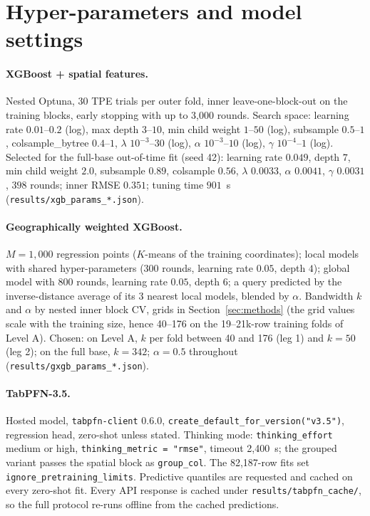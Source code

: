 \documentclass[11pt,a4paper]{article}
\begin{document}
\section{Hyper-parameters and model settings}
\label{app:hparams}

\paragraph{XGBoost + spatial features.} Nested Optuna, 30 TPE trials per outer fold, inner
leave-one-block-out on the training blocks, early stopping with up to 3{,}000 rounds. Search
space: learning rate $0.01$--$0.2$ (log), max depth $3$--$10$, min child weight $1$--$50$
(log), subsample $0.5$--$1$, colsample\_bytree $0.4$--$1$, $\lambda$ $10^{-3}$--$30$ (log),
$\alpha$ $10^{-3}$--$10$ (log), $\gamma$ $10^{-4}$--$1$ (log). Selected for the full-base
out-of-time fit (seed 42): learning rate $0.049$, depth $7$, min child weight $2.0$, subsample
$0.89$, colsample $0.56$, $\lambda$ $0.0033$, $\alpha$ $0.0041$, $\gamma$ $0.0031$, $398$
rounds; inner RMSE $0.351$; tuning time $901$~s
(\texttt{results/xgb\_params\_*.json}).

\paragraph{Geographically weighted XGBoost.} $M = 1{,}000$ regression points ($K$-means of the
training coordinates); local models with shared hyper-parameters ($300$ rounds, learning rate
$0.05$, depth $4$); global model with $800$ rounds, learning rate $0.05$, depth $6$; a query
predicted by the inverse-distance average of its $3$ nearest local models, blended by $\alpha$.
Bandwidth $k$ and $\alpha$ by nested inner block CV, grids in Section~\ref{sec:methods} (the
grid values scale with the training size, hence 40--176 on the 19--21k-row training folds of
Level A). Chosen: on Level A, $k$ per fold between 40 and 176 (leg 1) and $k = 50$ (leg 2); on
the full base, $k = 342$; $\alpha = 0.5$ throughout
(\texttt{results/gxgb\_params\_*.json}).

\paragraph{TabPFN-3.5.} Hosted model, \texttt{tabpfn-client} 0.6.0,
\texttt{create\_default\_for\_version("v3.5")}, regression head, zero-shot unless stated.
Thinking mode: \texttt{thinking\_effort} medium or high, \texttt{thinking\_metric = "rmse"},
timeout 2{,}400~s; the grouped variant passes the spatial block as \texttt{group\_col}. The
82{,}187-row fits set \texttt{ignore\_pretraining\_limits}. Predictive quantiles are requested and cached on every zero-shot fit. Every API response is cached under
\texttt{results/tabpfn\_cache/}, so the full protocol re-runs offline from the cached
predictions.
\end{document}
